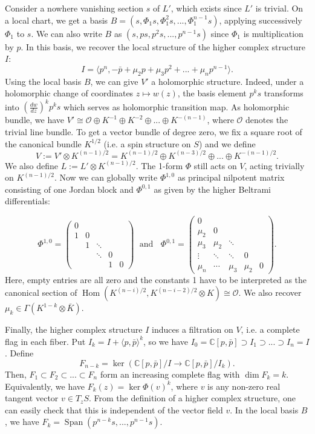 \documentclass[11pt]{amsart}
\numberwithin{thm}{section} %
\numberwithin{equation}{section} %
\numberwithin{figure}{section} %
\newcommand*{\C}{\mathbb{C}}
\renewcommand*{\S}{S}
\DeclareMathOperator{\Hom}{Hom}
\DeclareMathOperator{\Span}{Span}
\begin{document}
Consider a nowhere vanishing section $s$ of $L'$, which exists since $L'$ is trivial. On a local chart, we get a basis $B=(s,\Phi_1 s,\Phi_1^2s,...,\Phi_1^{n-1}s)$, applying successively $\Phi_1$ to $s$. We can also write $B$ as $(s,ps,p^2s,...,p^{n-1}s)$ since $\Phi_1$ is multiplication by $p$. In this basis, we recover the local structure of the higher complex structure $I$:
$$I=\langle p^n, -\bar{p}+\mu_2 p+\mu_3p^2+...+\mu_np^{n-1} \rangle.$$
Using the local basis $B$, we can give $V'$ a holomorphic structure. Indeed, under a holomorphic change of coordinates $z\mapsto w(z)$, the basis element $p^ks$ transforms into $(\frac{dw}{dz})^kp^ks$ which serves as holomorphic transition map. As holomorphic bundle, we have $V'\cong\mathcal{O}\oplus K^{-1}\oplus K^{-2}\oplus...\oplus K^{-(n-1)}$, where $\mathcal{O}$ denotes the trivial line bundle.
To get a vector bundle of degree zero, we fix a square root of the canonical bundle $K^{1/2}$ (i.e. a spin structure on $\S$) and we define $$V := V'\otimes K^{(n-1)/2} = K^{(n-1)/2}\oplus K^{(n-3)/2}\oplus...\oplus K^{-(n-1)/2}.$$
We also define $L:=L'\otimes K^{(n-1)/2}$. The 1-form $\Phi$ still acts on $V$, acting trivially on $K^{(n-1)/2}$. Now we can globally write $\Phi^{1,0}$ as principal nilpotent matrix consisting of one Jordan block and $\Phi^{0,1}$ as given by the higher Beltrami differentials:

\begin{equation}\label{Eq:matrix-Phi}
\Phi^{1,0} = \begin{pmatrix}   0&&&&  \\ 1&0  &&& \\ &1 &\ddots  && \\ &&\ddots &0& \\ &&&1&0\end{pmatrix} \;\text{ and } \;\; \Phi^{0,1} = \begin{pmatrix}   0&&&&  \\ \mu_2 &0  &&& \\ \mu_3& \mu_2 &\ddots  && \\ \vdots & \ddots &\ddots &0& \\ \mu_n&\cdots&\mu_3&\mu_2&0\end{pmatrix}.
\end{equation}
Here, empty entries are all zero and the constants 1 have to be interpreted as the canonical section of $\Hom(K^{(n-i)/2},K^{(n-i-2)/2}\otimes K) \cong \mathcal{O}$. We also recover $\mu_k\in \Gamma(K^{1-k}\otimes \bar{K})$.

Finally, the higher complex structure $I$ induces a filtration on $V$, i.e. a complete flag in each fiber. Put $I_k=I+\langle p,\bar{p} \rangle^k$, so we have $I_0=\C[p, \bar{p}] \supset I_1 \supset ...\supset I_n = I$. Define $$F_{n-k}=\ker (\mathbb{C}[p,\bar{p}]/I \rightarrow \C[p, \bar{p}]/I_k).$$ Then, $F_1\subset F_2\subset ...\subset F_n$ form an increasing complete flag with $\dim F_k=k$. Equivalently, we have $F_k(z)=\ker \Phi(v)^k$, where $v$ is any non-zero real tangent vector $v\in T_z\S$. From the definition of a higher complex structure, one can easily check that this is independent of the vector field $v$. In the local basis $B$, we have $F_k=\Span(p^{n-k}s,...,p^{n-1}s)$.
\end{document}
